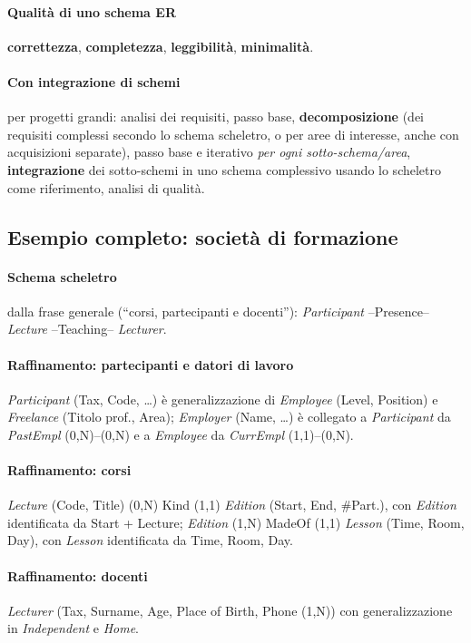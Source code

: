 \documentclass[a4paper,12pt]{article}
\begin{document}
\paragraph{Qualità di uno schema ER} \textbf{correttezza},
\textbf{completezza}, \textbf{leggibilità}, \textbf{minimalità}.

\paragraph{Con integrazione di schemi} per progetti grandi: analisi dei
requisiti, passo base, \textbf{decomposizione} (dei requisiti complessi
secondo lo schema scheletro, o per aree di interesse, anche con acquisizioni
separate), passo base e iterativo \emph{per ogni sotto-schema/area},
\textbf{integrazione} dei sotto-schemi in uno schema complessivo usando lo
scheletro come riferimento, analisi di qualità.

\subsection{Esempio completo: società di formazione}

\paragraph{Schema scheletro} dalla frase generale (``corsi, partecipanti e
docenti''): \emph{Participant} --Presence-- \emph{Lecture} --Teaching--
\emph{Lecturer}.

\paragraph{Raffinamento: partecipanti e datori di lavoro} \emph{Participant}
(Tax, Code, \dots) è generalizzazione di \emph{Employee} (Level, Position) e
\emph{Freelance} (Titolo prof., Area); \emph{Employer} (Name, \dots) è
collegato a \emph{Participant} da \emph{PastEmpl} (0,N)--(0,N) e a
\emph{Employee} da \emph{CurrEmpl} (1,1)--(0,N).

\paragraph{Raffinamento: corsi} \emph{Lecture} (Code, Title) (0,N) Kind (1,1)
\emph{Edition} (Start, End, \#Part.), con \emph{Edition} identificata da
Start + Lecture; \emph{Edition} (1,N) MadeOf (1,1) \emph{Lesson} (Time, Room,
Day), con \emph{Lesson} identificata da Time, Room, Day.

\paragraph{Raffinamento: docenti} \emph{Lecturer} (Tax, Surname, Age, Place of
Birth, Phone (1,N)) con generalizzazione in \emph{Independent} e \emph{Home}.
\end{document}
